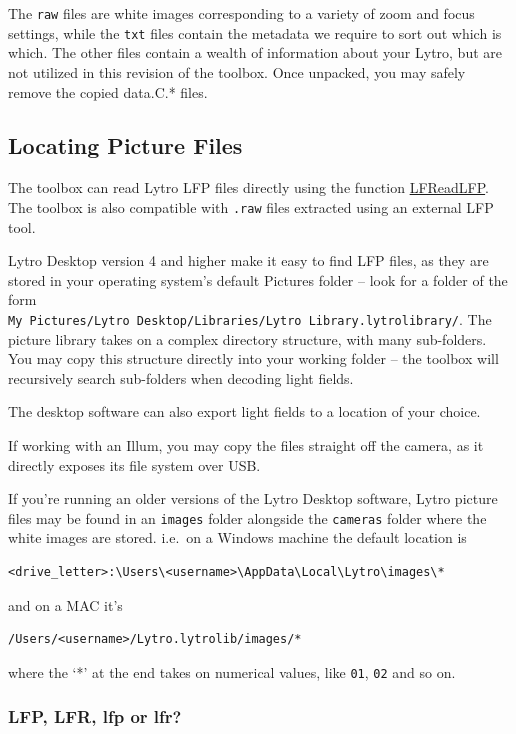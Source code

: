 \documentclass[onecolumn]{article}
\newcommand{\CiteFunc}[1]{\hyperlink{#1}{\small #1}}
\newcommand{\SymbolText}[1]{\texttt{\small #1}}
\begin{document}
\begin{appendices}
The \SymbolText{raw} files are white images corresponding to a variety of zoom and focus settings, while the \SymbolText{txt} files contain the metadata we require to sort out which is which. The other files contain a wealth of information about your Lytro, but are not utilized in this revision of the toolbox.  Once unpacked, you may safely remove the copied data.C.* files.

\subsection{Locating Picture Files}
\label{sect_LytroFiles_Pict}

The toolbox can read Lytro LFP files directly using the function \CiteFunc{LFReadLFP}.  The toolbox is also compatible with \SymbolText{.raw} files extracted using an external LFP tool.

Lytro Desktop version 4 and higher make it easy to find LFP files, as they are stored in your operating system's default Pictures folder -- look for a folder of the form\\ \SymbolText{My Pictures/Lytro Desktop/Libraries/Lytro Library.lytrolibrary/}.  The picture library takes on a complex directory structure, with many sub-folders.  You may copy this structure directly into your working folder -- the toolbox will recursively search sub-folders when decoding light fields.  

The desktop software can also export light fields to a location of your choice.

If working with an Illum, you may copy the files straight off the camera, as it directly exposes its file system over USB.

If you're running an older versions of the Lytro Desktop software, Lytro picture files may be found in an \SymbolText{images} folder alongside the \SymbolText{cameras} folder where the white images are stored. i.e.\  on a Windows machine the default location is
\begin{Verbatim} 
<drive_letter>:\Users\<username>\AppData\Local\Lytro\images\*
\end{Verbatim}
and on a MAC it's
\begin{Verbatim} 
/Users/<username>/Lytro.lytrolib/images/*
\end{Verbatim}
where the `*' at the end takes on numerical values, like \SymbolText{01}, \SymbolText{02} and so on. 

\subsubsection{LFP, LFR, lfp or lfr?}


\end{appendices}
\end{document}
